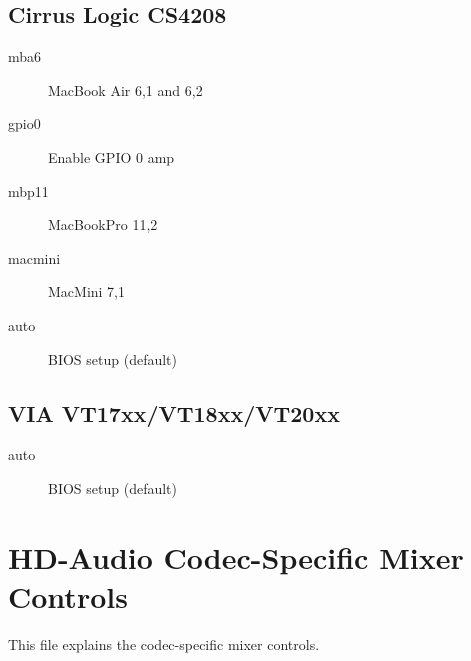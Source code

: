 \documentclass[a4paper,8pt,english]{sphinxmanual}
\begin{document}
\subsection{Cirrus Logic CS4208}
\label{sound/hd-audio/models:cirrus-logic-cs4208}\begin{description}
\item[{mba6}] \leavevmode
MacBook Air 6,1 and 6,2

\item[{gpio0}] \leavevmode
Enable GPIO 0 amp

\item[{mbp11}] \leavevmode
MacBookPro 11,2

\item[{macmini}] \leavevmode
MacMini 7,1

\item[{auto}] \leavevmode
BIOS setup (default)

\end{description}


\subsection{VIA VT17xx/VT18xx/VT20xx}
\label{sound/hd-audio/models:via-vt17xx-vt18xx-vt20xx}\begin{description}
\item[{auto}] \leavevmode
BIOS setup (default)

\end{description}


\section{HD-Audio Codec-Specific Mixer Controls}
\label{sound/hd-audio/controls:hd-audio-codec-specific-mixer-controls}\label{sound/hd-audio/controls::doc}
This file explains the codec-specific mixer controls.
\end{document}
